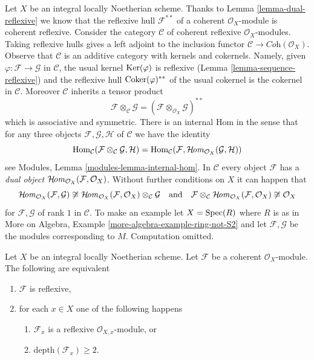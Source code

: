 \begin{remark}
\label{remark-tensor}
Let $X$ be an integral locally Noetherian scheme. Thanks to
Lemma \ref{lemma-dual-reflexive} we know that the reflexive
hull $\mathcal{F}^{**}$ of a coherent $\mathcal{O}_X$-module
is coherent reflexive. Consider the category $\mathcal{C}$
of coherent reflexive $\mathcal{O}_X$-modules. Taking
reflexive hulls gives a left adjoint to the inclusion functor
$\mathcal{C} \to \textit{Coh}(\mathcal{O}_X)$.
Observe that $\mathcal{C}$ is an additive category
with kernels and cokernels. Namely, given
$\varphi : \mathcal{F} \to \mathcal{G}$ in $\mathcal{C}$, the
usual kernel $\mathop{\mathrm{Ker}}(\varphi)$ is reflexive
(Lemma \ref{lemma-sequence-reflexive}) and the reflexive hull
$\mathop{\mathrm{Coker}}(\varphi)^{**}$ of the usual cokernel
is the cokernel in $\mathcal{C}$. Moreover $\mathcal{C}$ inherits
a tensor product
$$
\mathcal{F} \otimes_\mathcal{C} \mathcal{G} =
(\mathcal{F} \otimes_{\mathcal{O}_X} \mathcal{G})^{**}
$$
which is associative and symmetric. There is an internal Hom
in the sense that for any three objects
$\mathcal{F}, \mathcal{G}, \mathcal{H}$ of
$\mathcal{C}$ we have the identity
$$
\mathop{\mathrm{Hom}}\nolimits_\mathcal{C}(\mathcal{F} \otimes_\mathcal{C} \mathcal{G}, \mathcal{H}) =
\mathop{\mathrm{Hom}}\nolimits_\mathcal{C}(\mathcal{F},
\mathop{\mathcal{H}\!\mathit{om}}\nolimits_{\mathcal{O}_X}(\mathcal{G}, \mathcal{H}))
$$
see Modules, Lemma \ref{modules-lemma-internal-hom}. In $\mathcal{C}$
every object $\mathcal{F}$ has a {\it dual object}
$\mathop{\mathcal{H}\!\mathit{om}}\nolimits_{\mathcal{O}_X}(\mathcal{F}, \mathcal{O}_X)$.
Without further conditions on $X$ it can happen that
$$
\mathop{\mathcal{H}\!\mathit{om}}\nolimits_{\mathcal{O}_X}(\mathcal{F}, \mathcal{G}) \not \cong
\mathop{\mathcal{H}\!\mathit{om}}\nolimits_{\mathcal{O}_X}(\mathcal{F}, \mathcal{O}_X)
\otimes_\mathcal{C} \mathcal{G}
\quad\text{and}\quad
\mathcal{F} \otimes_\mathcal{C}
\mathop{\mathcal{H}\!\mathit{om}}\nolimits_{\mathcal{O}_X}(\mathcal{F}, \mathcal{O}_X)
\not \cong \mathcal{O}_X
$$
for $\mathcal{F}, \mathcal{G}$ of rank $1$ in $\mathcal{C}$.
To make an example let $X = \mathop{\mathrm{Spec}}(R)$ where $R$ is as in
More on Algebra, Example \ref{more-algebra-example-ring-not-S2}
and let $\mathcal{F}, \mathcal{G}$ be the modules corresponding to $M$.
Computation omitted.
\end{remark}

\begin{lemma}
\label{lemma-reflexive-depth-2}
Let $X$ be an integral locally Noetherian scheme. Let $\mathcal{F}$
be a coherent $\mathcal{O}_X$-module. The following are equivalent
\begin{enumerate}
\item $\mathcal{F}$ is reflexive,
\item for each $x \in X$ one of the following happens
\begin{enumerate}
\item $\mathcal{F}_x$ is a reflexive $\mathcal{O}_{X, x}$-module, or
\item $\text{depth}(\mathcal{F}_x) \geq 2$.
\end{enumerate}
\end{enumerate}
\end{lemma}

